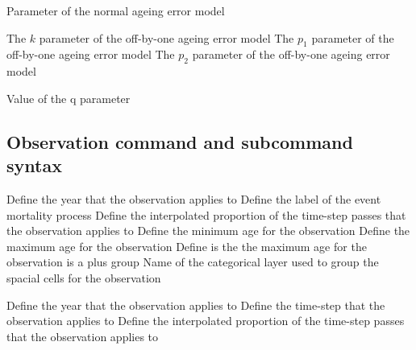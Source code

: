 \par\textbf{}\par
{} {Parameter of the normal ageing error model}
\par\textbf{}\par
{} {The $k$ parameter of the off-by-one ageing error model}
 {The $p_1$ parameter of the off-by-one ageing error model}
 {The $p_2$ parameter of the off-by-one ageing error model}
\par {}\par
{} {Value of the q parameter}
\subsection{Observation command and subcommand syntax}
\par
{} {Define the year that the observation applies to}
 {Define the label of the event mortality process}
 {Define the interpolated proportion of the time-step passes that the observation applies to}
 {Define the minimum age for the observation}
 {Define the maximum age for the observation}
 {Define is the the maximum age for the observation is a plus group}
 {Name of the categorical layer used to group the spacial cells for the observation}
\par {}\par
{} {Define the year that the observation applies to}
 {Define the time-step that the observation applies to}
 {Define the interpolated proportion of the time-step passes that the observation applies to}

